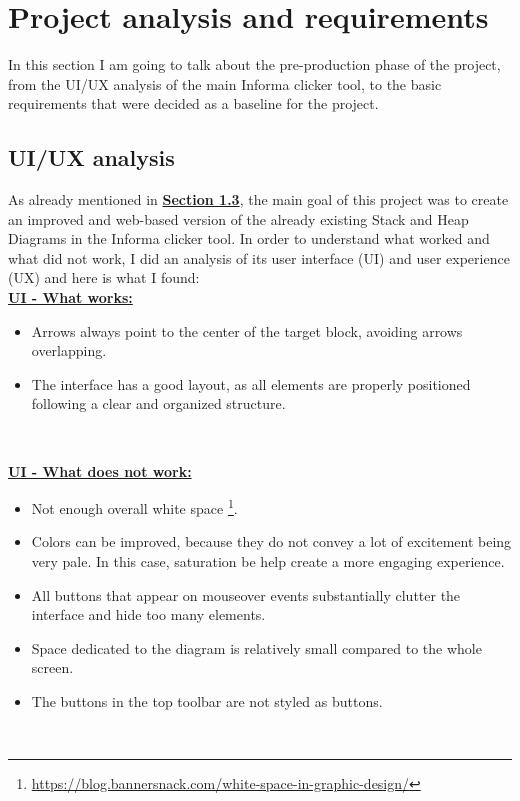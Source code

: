 \documentclass[]{usiinfbachelorproject}
\begin{document}
\vspace{\fill}
\pagebreak

\section{Project analysis and requirements} \label{requirements+analysis}

In this section I am going to talk about the pre-production phase of the project, from the UI/UX analysis of the main Informa clicker tool, to the basic requirements that were decided as a baseline for the project.

\subsection{UI/UX analysis}

As already mentioned in \hyperref[goal]{\textbf{Section 1.3}}, the main goal of this project was to create an improved and web-based version of the already existing Stack and Heap Diagrams in the Informa clicker tool. In order to understand what worked and what did not work, I did an analysis of its user interface (UI) and user experience (UX) and here is what I found:\\

\textbf{\ul{UI - What works:}}

\begin{itemize}
	\item Arrows always point to the center of the target block, avoiding arrows overlapping.
	\item The interface has a good layout, as all elements are properly positioned following a clear and organized structure.
\end{itemize}\

\textbf{\ul{UI - What does not work:}}

\begin{itemize}
	\item Not enough overall white space \footnote{\url{https://blog.bannersnack.com/white-space-in-graphic-design/}}.
	\item Colors can be improved, because they do not convey a lot of excitement being very pale. In this case, saturation be help create a more engaging experience.
	\item All buttons that appear on mouseover events substantially clutter the interface and hide too many elements.
	\item Space dedicated to the diagram is relatively small compared to the whole screen.
	\item The buttons in the top toolbar are not styled as buttons.
\end{itemize}\
\end{document}

